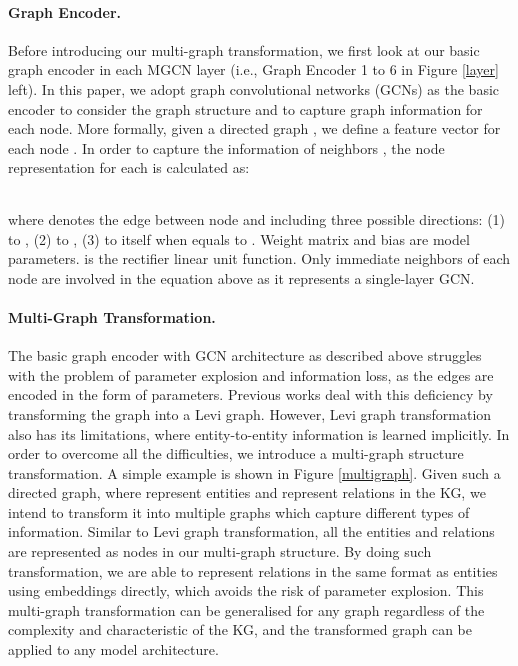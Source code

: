 \documentclass[11pt,a4paper]{article}
\begin{document}
\paragraph{Graph Encoder.}
Before introducing our multi-graph transformation, we first look at our basic graph encoder in each MGCN layer (i.e., Graph Encoder 1 to 6 in Figure \ref{layer} left).
In this paper, we adopt graph convolutional networks (GCNs) \cite{duvenaud2015convolutional,kearnes2016molecular,kipf2016semi,marcheggiani2017encoding} as the basic encoder to consider the graph structure and to capture graph information for each node. More formally, given a directed graph , we define a feature vector  for each node . In order to capture the information of neighbors , the node representation  for each  is calculated as:
\begin{center}
\begin{tabular}{c}
		
	\end{tabular}
\end{center}
where  denotes the edge between node  and  including three possible directions: (1)  to , (2)  to , (3)  to itself when  equals to . 
Weight matrix  and bias  are model parameters.  is the rectifier linear unit function. 
Only immediate neighbors of each node are involved in the equation above as it represents a single-layer GCN.




\paragraph{Multi-Graph Transformation.}
\label{sec:mgt}
The basic graph encoder with GCN architecture as described above struggles with the problem of parameter explosion and information loss, as the edges are encoded in the form of parameters.
Previous works \cite{beck2018graph,guo2019densely,koncel2019text} deal with this deficiency by transforming the graph into a Levi graph.
However, Levi graph transformation also has its limitations, where entity-to-entity information is learned implicitly.
In order to overcome all the difficulties, we introduce a multi-graph structure transformation.
A simple example is shown in Figure \ref{multigraph}.
Given such a directed graph, where  represent entities and  represent relations in the KG, we intend to transform it into multiple graphs which capture different types of information. 
Similar to Levi graph transformation, all the entities and relations are represented as nodes in our multi-graph structure.
By doing such transformation, we are able to represent relations in the same format as entities using embeddings directly, which avoids the risk of parameter explosion.
This multi-graph transformation can be generalised for any graph regardless of the complexity and characteristic of the KG, and the transformed graph can be applied to any model architecture.
\end{document}

